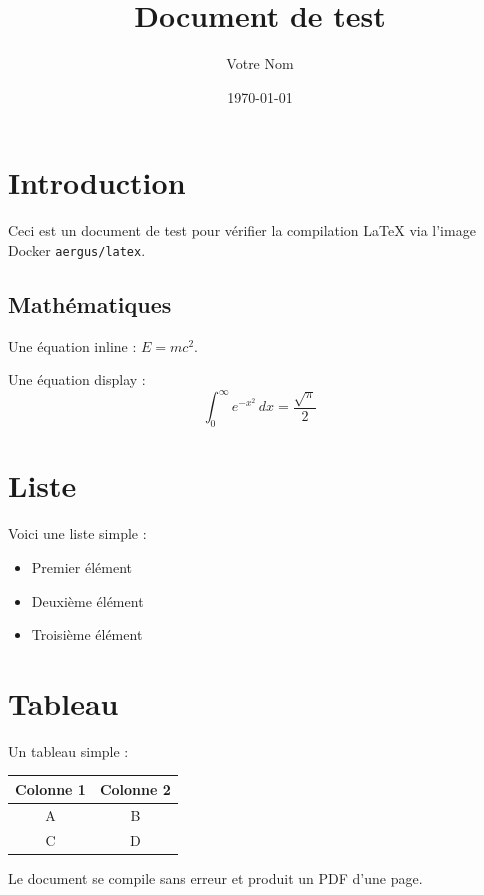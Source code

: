 \documentclass[a4paper,12pt]{article}
\title{Document de test}
\author{Votre Nom}
\date{\today}
\begin{document}
\maketitle

\section{Introduction}

Ceci est un document de test pour vérifier la compilation \LaTeX{} via
l'image Docker \texttt{aergus/latex}.

\subsection{Mathématiques}

Une équation inline : \( E = mc^2 \).

Une équation display :
\[
\int_{0}^{\infty} e^{-x^2} \, dx = \frac{\sqrt{\pi}}{2}
\]

\section{Liste}

Voici une liste simple :
\begin{itemize}
    \item Premier élément
    \item Deuxième élément
    \item Troisième élément
\end{itemize}

\section{Tableau}

Un tableau simple :
\begin{center}
\begin{tabular}{|c|c|}
    \hline
    Colonne 1 & Colonne 2 \\
    \hline
    A & B \\
    C & D \\
    \hline
\end{tabular}
\end{center}

Le document se compile sans erreur et produit un PDF d'une page.
\end{document}
